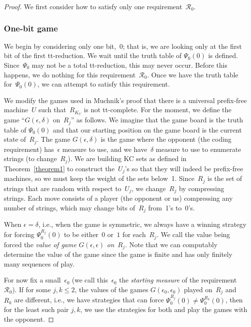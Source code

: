 \documentclass{LMCS}
\newcommand{\0}{\mathbf{0}}
\newcommand{\<}{\langle}
\renewcommand{\>}{\rangle}
\begin{document}
\begin{proof}
We first consider how to satisfy only one requirement~$\mathcal{R}_0$.



\subsubsection{One-bit game}\label{onebit}
We begin by considering only one bit,~0; that is, we are looking only at the
first bit of the first tt-reduction.  We wait until the truth table of
$\Psi_0(0)$ is defined.  Since~$\Psi_0$ may not be a total tt-reduction, this
may never occur.   Before this happens, we do nothing for this
requirement~$\mathcal{R}_0$. Once we have the truth table for~$\Psi_0(0)$, we
can attempt to satisfy this requirement.

We modify the games used in Muchnik's proof that there is a universal
prefix-free machine~${U}$ such that~$R_{K_{U}}$ is not tt-complete.  For the
moment, we define the game ``$G(\epsilon,\delta)$ on~$R_j$'' as follows. We
imagine that the game board is the truth table of $\Psi_0(0)$ and that our
starting position on the game board is the current state of~$R_j$.  The game
$G(\epsilon,\delta)$ is the game where the opponent (the coding requirement)
has~$\epsilon$ measure to use, and we have~$\delta$ measure to use to
enumerate strings (to change~$R_j$).  We are building KC sets as defined in
Theorem~\ref{theorem1} to construct the~$ U_j$'s so that they will indeed be
prefix-free machines, so we must keep the weight of the sets below~1.
Since~$R_j$ is the set of strings that are random with respect to~$U_j$, we
change~$R_j$ by compressing strings.  Each move consists of a player (the
opponent or us) compressing any number of strings, which may change bits
of~$R_j$ from~1's to~0's.

When $\epsilon=\delta$, i.e., when the game is symmetric, we always have a
winning strategy for forcing $\Psi_0^{R_j}(0)$ to be either~$0$ or~$1$ for
each~$R_j$.  We call the value being forced the \emph{value of game
$G(\epsilon,\epsilon)$ on~$R_j$}.  Note that we can computably determine the
value of the game since the game is finite and has only finitely many
sequences of play.

For now fix a small~$\epsilon_0$ (we call this~$\epsilon_0$ the
\emph{starting measure} of the requirement~$\mathcal{R}_0$). If for some $j,k
\le 2$, the values of the games $G(\epsilon_0,\epsilon_0)$ played on~$R_j$
and~$R_k$ are different, i.e., we have strategies that can force
$\Psi_0^{R_j}(0)\neq\Psi_0^{R_k}(0)$, then for the least such pair $j,k$, we
use the strategies for both and play the games with the opponent.


\end{proof}
\end{document}
